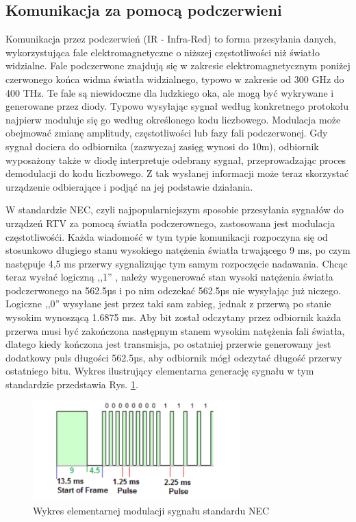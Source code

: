 \documentclass[12pt,twoside]{article}
\begin{document}
\subsection{Komunikacja za pomocą podczerwieni}
Komunikacja przez podczerwień\cite{infrared} (IR - Infra-Red) to forma przesyłania danych, wykorzystująca fale elektromagnetyczne
o niższej częstotliwości niż światło widzialne. Fale podczerwone znajdują się w zakresie elektromagnetycznym
poniżej czerwonego końca widma światła widzialnego, typowo w zakresie od 300 GHz do 400 THz. Te fale są
niewidoczne dla ludzkiego oka, ale mogą być wykrywane i generowane przez diody. Typowo
wysyłając sygnał według konkretnego protokołu najpierw moduluje się go według określonego kodu liczbowego.
Modulacja może obejmować zmianę amplitudy, częstotliwości lub fazy fali podczerwonej. Gdy sygnał dociera do odbiornika
(zazwyczaj zasięg wynosi do 10m), odbiornik wyposażony także w diodę interpretuje odebrany sygnał, przeprowadzając proces demodulacji do kodu
liczbowego. Z tak wysłanej informacji może teraz skorzystać urządzenie odbierające i podjąć na jej podstawie działania.

W standardzie NEC\cite{necIR}, czyli najpopularniejszym sposobie przesyłania sygnałów do urządzeń RTV za pomocą światła podczerownego, zastosowana jest modulacja częstotliwośći. Każda wiadomość w tym typie komunikacji rozpoczyna się od stosunkowo długiego stanu wysokiego natężenia światła trwającego 9 ms, po czym następuje 4,5 ms przerwy sygnalizując tym samym rozpoczęcie nadawania. Chcąc teraz wysłać logiczną ,,1'' , należy wygenerować stan wysoki natężenia światła podczerwonego na 562.5µs i po nim odczekać 562.5µs nie wysyłając już niczego. Logiczne ,,0'' wysyłane jest przez taki sam zabieg, jednak z przerwą po stanie wysokim wynoszącą 1.6875 ms. Aby bit został odczytany przez odbiornik każda przerwa musi być zakończona następnym stanem wysokim natężenia fali światła, dlatego kiedy kończona jest transmisja, po ostatniej przerwie generowany jest dodatkowy puls długości 562.5µs, aby odbiornik mógł odczytać długość przerwy ostatniego bitu. Wykres ilustrujący elementarna generację sygnału w tym standardzie przedstawia Rys. \ref*{Fig:necOnesZerosFigure}.
\begin{figure}[ht]
   \centering
   \includegraphics[width=8cm]{images/necOnesAndZeros.png}
   \caption{Wykres elementarnej modulacji sygnału standardu NEC}
   \label{Fig:necOnesZerosFigure}
\end{figure}
\end{document}

